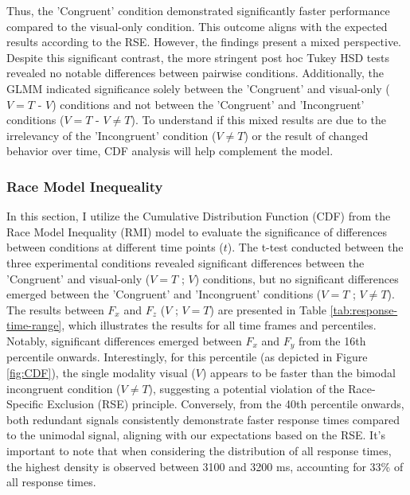 \documentclass[12pt,oneside,openright]{report}
\begin{document}
Thus, the 'Congruent' condition demonstrated significantly faster performance compared to the visual-only condition. This outcome aligns with the expected results according to the RSE. However, the findings present a mixed perspective. Despite this significant contrast, the more stringent post hoc Tukey HSD tests revealed no notable differences between pairwise conditions. Additionally, the GLMM indicated significance solely between the 'Congruent' and visual-only ($V=T$ - $V$) conditions and not between the 'Congruent' and 'Incongruent' conditions ($V=T$ - $V \neq T$). To understand if this mixed results are due to the irrelevancy of the 'Incongruent' condition ($V \neq T$) or the result of changed behavior over time, CDF analysis will help complement the model.

\subsubsection*{Race Model Inequeality}

In this section, I utilize the Cumulative Distribution Function (CDF) from the Race Model Inequality (RMI) model to evaluate the significance of differences between conditions at different time points ($t$). The t-test conducted between the three experimental conditions revealed significant differences between the 'Congruent' and visual-only ($V=T$ ; $V$) conditions, but no significant differences emerged between the 'Congruent' and 'Incongruent' conditions ($V=T$ ; $V \neq T$). The results between $F_x$ and $F_z$ ($V$ ; $V=T$) are presented in Table \ref{tab:response-time-range}, which illustrates the results for all time frames and percentiles. Notably, significant differences emerged between $F_x$ and $F_y$ from the 16th percentile onwards. Interestingly, for this percentile (as depicted in Figure \ref{fig:CDF}), the single modality visual ($V$) appears to be faster than the bimodal incongruent condition ($V \neq T$), suggesting a potential violation of the Race-Specific Exclusion (RSE) principle. Conversely, from the 40th percentile onwards, both redundant signals consistently demonstrate faster response times compared to the unimodal signal, aligning with our expectations based on the RSE. It's important to note that when considering the distribution of all response times, the highest density is observed between 3100 and 3200 ms, accounting for 33\% of all response times.
 
\end{document}
